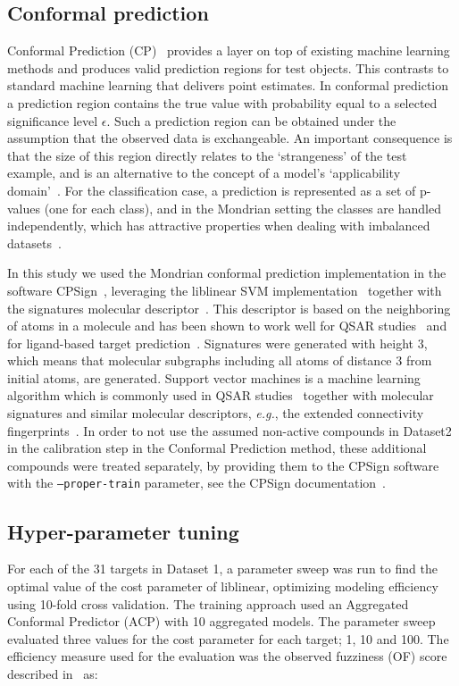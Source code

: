 \documentclass[10pt,article]{memoir}
\begin{document}
\subsection*{Conformal prediction}
Conformal Prediction (CP)~\cite{Vovk2005} provides a layer on top of
existing machine learning methods and produces valid prediction regions for test
objects. This contrasts to standard machine learning that delivers point
estimates. In conformal prediction a prediction region contains the true
value with probability equal to a selected significance level $\epsilon$. Such
a prediction region can be obtained under the assumption that the observed data
is exchangeable. An important consequence is that the size of this region directly
relates to the `strangeness' of the test example, and is an alternative to the
concept of a model's `applicability domain'~\cite{norinder2014introducing}. For
the classification case, a prediction is represented as a set of p-values (one for each
class), and in the Mondrian setting the classes are handled independently,
which has attractive properties when dealing with imbalanced
datasets~\cite{Norinder:2017qc,Sun:2017qm}.

In this study we used the Mondrian conformal prediction implementation in the
software CPSign~\cite{CPSignDocs}, leveraging the
liblinear SVM implementation~\cite{fan2008liblinear} together with the
signatures molecular descriptor~\cite{faulon2003signature}.  This descriptor is
based on the neighboring of atoms in a molecule and has been shown to work
well for QSAR studies~\cite{lapins2018confidence,Alvarsson:2016pw} and for
ligand-based target prediction~\cite{alvarsson2014ligand}. Signatures were
generated with height 3, which means that molecular subgraphs including all atoms
of distance 3 from initial atoms, are generated. Support vector
machines is a machine learning algorithm which is commonly used in QSAR
studies~\cite{norinder2003support,zhou2011qsar} together with molecular
signatures and similar molecular descriptors, \textit{e.g.}, the extended
connectivity fingerprints~\cite{rogers2010extended}.
In order to not use the assumed non-active compounds in Dataset2 in the
calibration step in the Conformal Prediction method, these additional compounds
were treated separately, by providing them to the CPSign software with the
\texttt{--proper-train} parameter, see the CPSign
documentation~\cite{CPSignDocs}.


\subsection*{Hyper-parameter tuning}
For each of the 31 targets in Dataset 1, a parameter sweep was run to find the optimal value
of the cost parameter of liblinear, optimizing modeling efficiency using
10-fold cross validation. The training approach used an Aggregated Conformal
Predictor (ACP) with 10 aggregated models.  The parameter sweep evaluated three
values for the cost parameter for each target; 1, 10 and 100. The efficiency
measure used for the evaluation was the observed fuzziness (OF) score described
in~\cite{Vovk2016} as:
\end{document}
